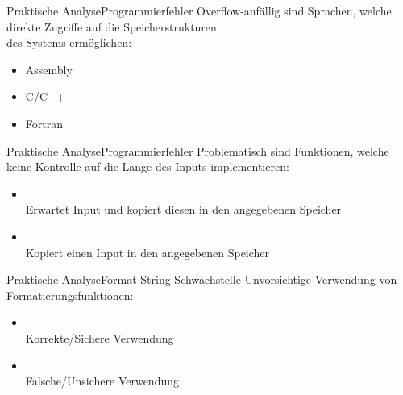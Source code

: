 \begin{frame}{Praktische Analyse}{Programmierfehler}
    Overflow-anfällig sind Sprachen, welche direkte Zugriffe auf die Speicherstrukturen\\ des Systems ermöglichen:
    \begin{itemize}
        \vspace{1em}
        \item Assembly
        \item C/C++
        \item Fortran
    \end{itemize}
\end{frame}

\begin{frame}{Praktische Analyse}{Programmierfehler}
    Problematisch sind Funktionen, welche
    keine Kontrolle auf die Länge des Inputs implementieren: %
    \begin{itemize}
        \vspace{1em}
        \item {}\\ Erwartet Input und kopiert diesen in den angegebenen Speicher
        \vspace{1em}
        \item {}\\ Kopiert einen Input
        in den angegebenen Speicher
    \end{itemize}
\end{frame}


\begin{frame}{Praktische Analyse}{Format-String-Schwachstelle}
    Unvorsichtige Verwendung von Formatierungsfunktionen:
    \begin{itemize}
        \vspace{1em}
        \item {}\\ Korrekte/Sichere Verwendung
        \vspace{1em}
        \item {}\\ Falsche/Unsichere Verwendung
    \end{itemize}
\end{frame}


